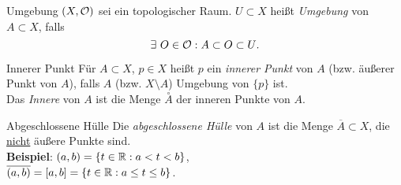 \begin{definition}{Umgebung}
  $ (X, \mathcal{O}) $ sei ein topologischer Raum. $ U \subset X $ heißt \emph{Umgebung} von $ A \subset X $, falls
  \begin{equation*}
    \exists \ O \in \mathcal{O} : A \subset O \subset U\text{.}
  \end{equation*}
\end{definition}

\begin{definition}{Innerer Punkt}
  Für $ A \subset X $, $ p \in X $ heißt $ p $ ein \emph{innerer Punkt} von $ A $ (bzw. äußerer Punkt von $ A $), falls $ A $ (bzw. $ X \setminus A $) Umgebung von $ \{ p \} $ ist. \\
  Das \emph{Innere} von $ A $ ist die Menge $ \overset{\circ}{A} $ der inneren Punkte von $ A $.
\end{definition}

\begin{definition}{Abgeschlossene Hülle}
  Die \emph{abgeschlossene Hülle} von $ A $ ist die Menge $ \overline{A} \subset X $, die \underline{nicht} äußere Punkte sind. \\
  \textbf{Beispiel}: $ (a, b) = \{ t \in \mathbb{R} : a < t < b \} $, \\ $ \overline{(a,b)} = [a,b] = \{ t \in \mathbb{R} : a \leq t \leq b \} $.
\end{definition}

